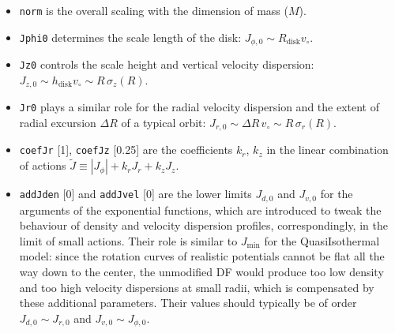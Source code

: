 \documentclass[12pt]{article}
\newcommand{\ppp}[1]{\textcolor{darkolive} {\texttt{#1}}}
\begin{document}
\begin{itemize}
\item \ppp{norm} is the overall scaling with the dimension of mass ($M$).
\item \ppp{Jphi0} determines the scale length of the disk: $J_{\phi,0} \sim R_\mathrm{disk}v_\circ$.
\item \ppp{Jz0} controls the scale height and vertical velocity dispersion: $J_{z,0} \sim h_\mathrm{disk}v_\circ \sim R\,\sigma_z(R)$.
\item \ppp{Jr0} plays a similar role for the radial velocity dispersion and the extent of radial excursion $\Delta R$ of a typical orbit: $J_{r,0} \sim \Delta R\,v_\circ \sim R\,\sigma_r(R)$.
\item \ppp{coefJr} [1], \ppp{coefJz} [0.25] are the coefficients $k_r$, $k_z$ in the linear combination of actions $\tilde J \equiv |J_\phi| + k_r J_r + k_z J_z$.
\item \ppp{addJden} [0] and \ppp{addJvel} [0] are the lower limits $J_{d,0}$ and $J_{v,0}$ for the arguments of the exponential functions, which are introduced to tweak the behaviour of density and velocity dispersion profiles, correspondingly, in the limit of small actions. Their role is similar to $J_\mathrm{min}$ for the QuasiIsothermal model: since the rotation curves of realistic potentials cannot be flat all the way down to the center, the unmodified DF would produce too low density and too high velocity dispersions at small radii, which is compensated by these additional parameters. Their values should typically be of order $J_{d,0} \sim J_{r,0}$ and $J_{v,0} \sim J_{\phi,0}$.
\end{itemize}
\end{document}
